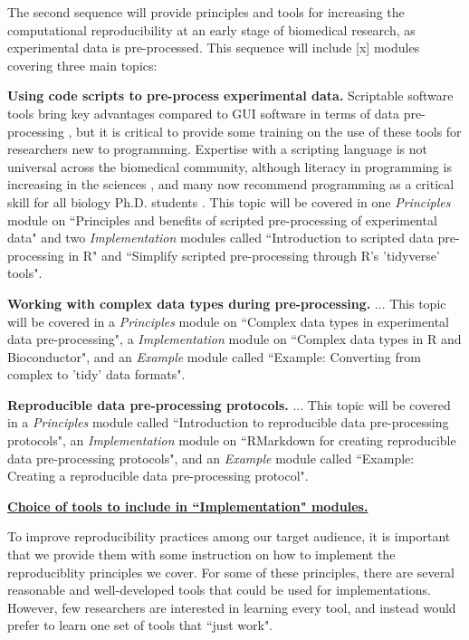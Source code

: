 \documentclass[pdftex,english,11pt,parskip=half]{scrartcl}
\begin{document}
The second sequence will provide principles and tools for increasing the computational reproducibility at an early stage of biomedical research, as experimental data is pre-processed. This sequence will include [x] modules covering three main topics: 

\textbf{Using code scripts to pre-process experimental data.} Scriptable software tools bring key advantages compared to GUI software in terms of data pre-processing \cite{cetinkaya2017infrastructure, huber2015orchestrating, preeyanon2014reproducible, piccolo2016tools}, but it is critical to provide some training on the use of these tools for researchers new to programming. Expertise with a scripting language is not universal across the biomedical community, although literacy in programming is increasing in the sciences \cite{ram2013git}, and many now recommend programming as a critical skill for all biology Ph.D. students \cite{list2017ten}. This topic will be covered in one \textit{Principles} module on ``Principles and benefits of scripted pre-processing of experimental data" and two \textit{Implementation} modules called ``Introduction to scripted data pre-processing in R" and ``Simplify scripted pre-processing through R's 'tidyverse' tools".

\textbf{Working with complex data types during pre-processing.} ... This topic will be covered in a \textit{Principles} module on ``Complex data types in experimental data pre-processing", a \textit{Implementation} module on ``Complex data types in R and Bioconductor", and an \textit{Example} module called ``Example: Converting from complex to 'tidy' data formats".

\textbf{Reproducible data pre-processing protocols.} ... This topic will be covered in a \textit{Principles} module called ``Introduction to reproducible data pre-processing protocols", an \textit{Implementation} module on ``RMarkdown for creating reproducible data pre-processing protocols", and an \textit{Example} module called ``Example: Creating a reproducible data pre-processing protocol". 

\underline{\textbf{Choice of tools to include in ``Implementation" modules.}}

To improve reproducibility practices among our target audience, it is important that we provide them with some instruction on how to implement the reproduciblity principles we cover. For some of these principles, there are several reasonable and well-developed tools that could be used for implementations. However, few researchers are interested in learning every tool, and instead would prefer to learn one set of tools that ``just work". 
\end{document}
